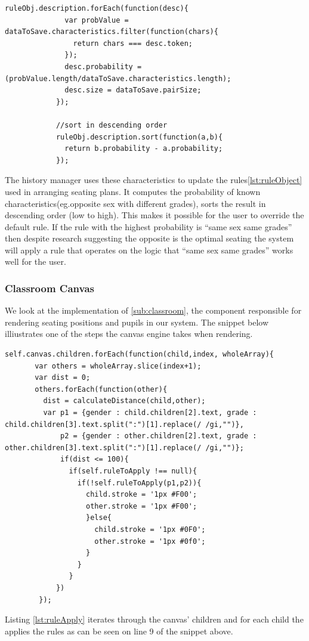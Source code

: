 \begin{lstlisting}[caption={Updates user model with the new rule}, label={lst:updateRule}]
    ruleObj.description.forEach(function(desc){
              var probValue = dataToSave.characteristics.filter(function(chars){
                return chars === desc.token;
              });
              desc.probability = (probValue.length/dataToSave.characteristics.length);
              desc.size = dataToSave.pairSize;
            });

            //sort in descending order
            ruleObj.description.sort(function(a,b){
              return b.probability - a.probability;
            });
\end{lstlisting}
The history manager uses these characteristics to update the rules\ref{lst:ruleObject} used in arranging seating plans. It computes the probability of known characteristics(eg.opposite sex with different grades), sorts the result in descending order (low to high). This makes it possible for the user to override the default rule. If the rule with the highest probability is ``same sex same grades'' then despite research suggesting the opposite is the optimal seating the system will apply a rule that operates on the logic that ``same sex same grades'' works well for the user. 

\subsubsection{Classroom Canvas} \label{sub:classroomCanvas}
We look at the implementation of \ref{sub:classroom}, the component responsible for rendering seating positions and pupils in our system. The snippet below illiustrates one of the steps the canvas engine takes when rendering. 
\begin{lstlisting}[caption={Applies seating rules to individual pupil}, label={lst:ruleApply}]
    self.canvas.children.forEach(function(child,index, wholeArray){
       var others = wholeArray.slice(index+1);
       var dist = 0;
       others.forEach(function(other){
         dist = calculateDistance(child,other);
         var p1 = {gender : child.children[2].text, grade : child.children[3].text.split(":")[1].replace(/ /gi,"")},
             p2 = {gender : other.children[2].text, grade : other.children[3].text.split(":")[1].replace(/ /gi,"")};
             if(dist <= 100){
               if(self.ruleToApply !== null){
                 if(!self.ruleToApply(p1,p2)){
                   child.stroke = '1px #F00';
                   other.stroke = '1px #F00';
                   }else{
                     child.stroke = '1px #0F0';
                     other.stroke = '1px #0f0';
                   }
                 }
               }
            })
        });
\end{lstlisting}
Listing \ref{lst:ruleApply} iterates through the canvas' children and for each child the applies the rules as can be seen on line 9 of the snippet above. 
